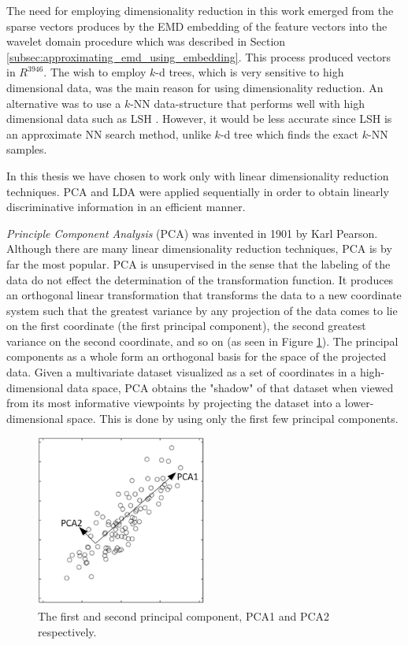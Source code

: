 \iftoggle{edit-mode}{\hspace{0pt}\marginpar{Why do we need DR?}}{}
The need for employing dimensionality reduction in this work emerged from the sparse vectors produces by the EMD embedding of the feature vectors into the wavelet domain procedure which was described in Section \ref{subsec:approximating_emd_using_embedding}. This process produced vectors in $R^{3946}$. The wish to employ $k$-d trees, which is very sensitive to high dimensional data, was the main reason for using dimensionality reduction. An alternative was to use a $k$-NN data-structure that performs well with high dimensional data such as LSH \cite{gionis1999similarity}. However, it would be less accurate since LSH is an approximate NN search method, unlike $k$-d tree which finds the exact $k$-NN samples.

\iftoggle{edit-mode}{\hspace{0pt}\marginpar{What DR we use?}}{}
In this thesis we have chosen to work only with linear dimensionality reduction techniques. PCA and LDA were applied sequentially in order to obtain linearly discriminative information in an efficient manner.

\iftoggle{edit-mode}{\hspace{0pt}\marginpar{PCA}}{}
\emph{Principle Component Analysis} (PCA) was invented in 1901 by Karl Pearson. Although there are many linear dimensionality reduction techniques, PCA is by far the most popular. PCA is unsupervised in the sense that the labeling of the data do not effect the determination of the transformation function. It produces an orthogonal linear transformation that transforms the data to a new coordinate system such that the greatest variance by any projection of the data comes to lie on the first coordinate (the first principal component), the second greatest variance on the second coordinate, and so on (as seen in Figure \ref{fig:pca_demo}). The principal components as a whole form an orthogonal basis for the space of the projected data. Given a multivariate dataset visualized as a set of coordinates in a high-dimensional data space, PCA obtains the "shadow" of that dataset when viewed from its most informative viewpoints by projecting the dataset into a lower-dimensional space. This is done by using only the first few principal components.

\begin{figure}
\centering
\includegraphics[width=0.5\textwidth]{./figures/pca_demo}       
\caption{The first and second principal component, PCA1 and PCA2 respectively.}
\label{fig:pca_demo}
\end{figure}

